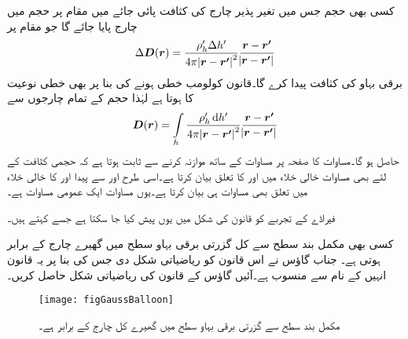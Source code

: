 کسی بھی حجم جس میں تغیر پذیر  چارج کی کثافت پائی جائے میں مقام  پر  حجم میں   چارج پایا جائے گا جو مقام  پر
\begin{align*}
\Delta {\ensuremath{{\boldsymbol{D}}}}({{\boldsymbol{r}}})=\frac{\rho_h' \Delta h'}{4\pi \abs{{{\boldsymbol{r}}}-{{\boldsymbol{r'}}}}^2} \frac{{{\boldsymbol{r}}}-{{\boldsymbol{r'}}}}{\abs{{{\boldsymbol{r}}}-{{\boldsymbol{r'}}}}}
\end{align*} 
برقی بہاو کی کثافت پیدا کرے گا۔قانون کولومب خطی ہونے کی بنا پر  بھی خطی نوعیت کا ہوتا ہے لہٰذا حجم کے تمام چارجوں سے
\begin{align}\label{مساوات_گاؤس_حجم_چارج_کے_بہاو_کی_کثافت}
\kvec{D}(\kvec{r})=\int\limits_{h}\frac{\rho_h' \dif h'}{4\pi \abs{\kvec{r}-\kvec{r'}}^2} \frac{\kvec{r}-\kvec{r'}}{\abs{\kvec{r}-\kvec{r'}}}
\end{align} 
حاصل ہو گا۔مساوات  کا صفحہ  پر مساوات  کے ساتھ موازنہ کرنے سے ثابت ہوتا ہے کہ حجمی کثافت کے لئے بھی مساوات  خالی خلاء میں  اور  کا تعلق بیان کرتا ہے۔اسی طرح  اور  سے پیدا  اور  کا خالی خلاء میں تعلق بھی مساوات   ہی بیان کرتا ہے۔یوں  مساوات  ایک عمومی مساوات ہے۔

فیراڈے کے تجربے کو قانون کی شکل میں یوں پیش کیا جا سکتا ہے جسے  کہتے ہیں۔

کسی بھی مکمل بند سطح سے  کل گزرتی برقی بہاو سطح میں گھیرے چارج کے برابر ہوتی ہے۔
جناب گاؤس نے اس قانون کو ریاضیاتی شکل دی جس کی بنا پر یہ قانون انہیں کے نام سے منسوب ہے۔آئیں گاؤس کے قانون کی ریاضیاتی شکل حاصل کریں۔
\begin{figure}
\centering
\texttt{[image: figGaussBalloon]}
\caption{مکمل بند سطح سے گزرتی برقی بہاو سطح میں گھیرے کل چارج کے برابر ہے۔}
\label{شکل_گاؤس_کا_قانون}
\end{figure}

